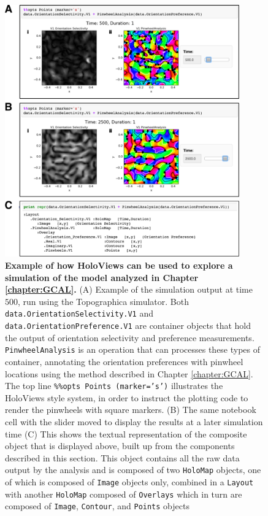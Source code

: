 \documentclass[phd,ianc,twoside]{infthesis}
\begin{document}
\begin{figure}
  \center
  \includegraphics[width=0.9\textwidth]{./figures/HoloViews_GCAL_example.pdf}
  \caption{{\bf Example of how HoloViews can be used to explore a
      simulation of the model analyzed in Chapter \ref{chapter:GCAL}.}
    (A) Example of the simulation output at time $500$, run using the
    Topographica simulator. Both {\tt data.OrientationSelectivity.V1}
    and {\tt data.OrientationPreference.V1} are container objects that
    hold the output of orientation selectivity and preference
    measurements. {\tt PinwheelAnalysis} is an operation that can
    processes these types of container, annotating the orientation
    preferences with pinwheel locations using the method described in
    Chapter \ref{chapter:GCAL}. The top line {\tt \%\%opts Points
      (marker='s')} illustrates the HoloViews style system, in order to
    instruct the plotting code to render the pinwheels with square
    markers.  (B) The same notebook cell with the slider moved to
    display the results at a later simulation time (C) This shows the
    textual representation of the composite object that is displayed
    above, built up from the components described in this section. This
    object contains all the raw data output by the analysis and is
    composed of two {\tt HoloMap} objects, one of which is composed of
    {\tt Image} objects only, combined in a {\tt Layout} with another
    {\tt HoloMap} composed of {\tt Overlays} which in turn are composed
    of {\tt Image}, {\tt Contour}, and {\tt Points} objects}
\label{fig:HoloViews_GCAL_example}
\end{figure}
\end{document}
